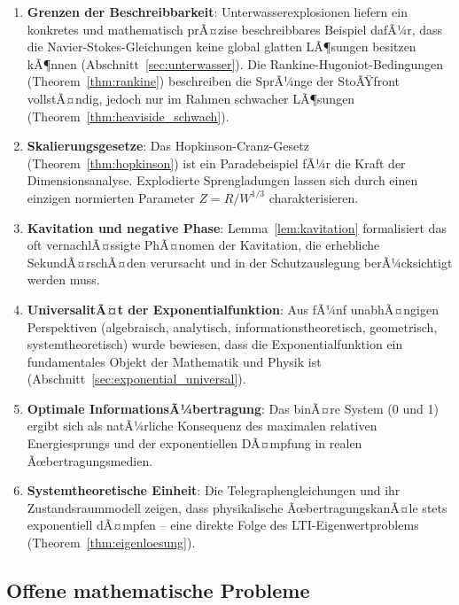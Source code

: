 ﻿\documentclass[12pt,a4paper]{article}
\theoremstyle{definition}
\theoremstyle{remark}
\begin{document}
\begin{enumerate}[leftmargin=*, label=\textbf{(\theenumi)}]
\item \textbf{Grenzen der Beschreibbarkeit}: Unterwasserexplosionen liefern ein konkretes und mathematisch prÃ¤zise beschreibbares Beispiel dafÃ¼r, dass die Navier-Stokes-Gleichungen keine global glatten LÃ¶sungen besitzen kÃ¶nnen (Abschnitt~\ref{sec:unterwasser}). Die Rankine-Hugoniot-Bedingungen (Theorem~\ref{thm:rankine}) beschreiben die SprÃ¼nge der StoÃŸfront vollstÃ¤ndig, jedoch nur im Rahmen schwacher LÃ¶sungen (Theorem~\ref{thm:heaviside_schwach}).

\item \textbf{Skalierungsgesetze}: Das Hopkinson-Cranz-Gesetz (Theorem~\ref{thm:hopkinson}) ist ein Paradebeispiel fÃ¼r die Kraft der Dimensionsanalyse. Explodierte Sprengladungen lassen sich durch einen einzigen normierten Parameter $Z = R/W^{1/3}$ charakterisieren.

\item \textbf{Kavitation und negative Phase}: Lemma~\ref{lem:kavitation} formalisiert das oft vernachlÃ¤ssigte PhÃ¤nomen der Kavitation, die erhebliche SekundÃ¤rschÃ¤den verursacht und in der Schutzauslegung berÃ¼cksichtigt werden muss.

\item \textbf{UniversalitÃ¤t der Exponentialfunktion}: Aus fÃ¼nf unabhÃ¤ngigen Perspektiven (algebraisch, analytisch, informationstheoretisch, geometrisch, systemtheoretisch) wurde bewiesen, dass die Exponentialfunktion ein fundamentales Objekt der Mathematik und Physik ist (Abschnitt~\ref{sec:exponential_universal}).

\item \textbf{Optimale InformationsÃ¼bertragung}: Das binÃ¤re System (0 und 1) ergibt sich als natÃ¼rliche Konsequenz des maximalen relativen Energiesprungs und der exponentiellen DÃ¤mpfung in realen Ãœbertragungsmedien.

\item \textbf{Systemtheoretische Einheit}: Die Telegraphengleichungen und ihr Zustandsraummodell zeigen, dass physikalische ÃœbertragungskanÃ¤le stets exponentiell dÃ¤mpfen -- eine direkte Folge des LTI-Eigenwertproblems (Theorem~\ref{thm:eigenloesung}).
\end{enumerate}

\subsection{Offene mathematische Probleme}
\end{document}
